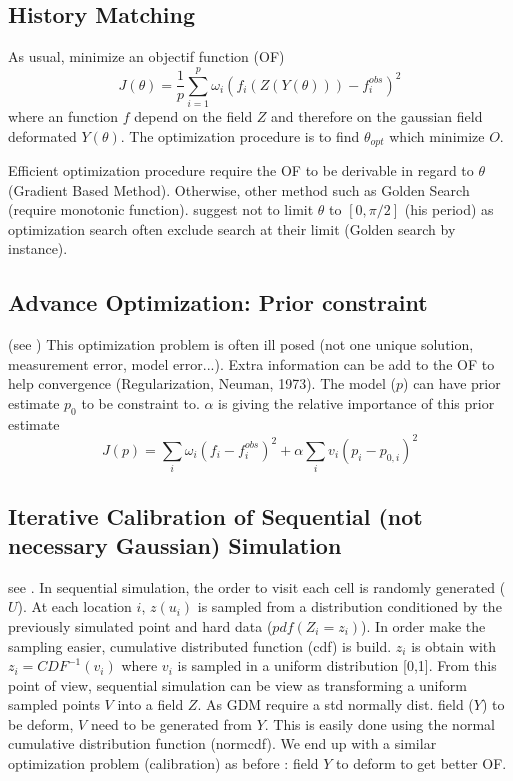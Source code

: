 \documentclass{article}
\begin{document}
\begin{multicols}{2}
\subsection{History Matching}
As usual, minimize an objectif function (OF) 
\[ J(\theta) = \frac{1}{p} \sum_{i=1}^{p} \omega_i (f_i(Z(Y(\theta))) - f_i^{obs})^2 \]
 where an function $f$ depend on the field $Z$ and therefore on the gaussian field deformated $Y(\theta)$. The optimization procedure is to find $\theta_{opt}$ which minimize $O$.

Efficient optimization procedure require the OF to be derivable in regard to $\theta$ (Gradient Based Method). Otherwise, other method such as Golden Search (require monotonic function). \cite{Hu2000} suggest not to limit $\theta$ to $[0,\pi/2]$ (his period) as optimization search often exclude search at their limit (Golden search by instance).

\subsection{Advance Optimization: Prior constraint}
(see \citep{LeRavalec-Dupin2002})
This optimization problem is often ill posed (not one unique solution, measurement error, model error...). Extra information can be add to the OF to help convergence (Regularization, Neuman, 1973). The model ($p$) can have prior estimate $p_0$ to be constraint to. $\alpha$ is giving the relative importance of this prior estimate
\[ J(p)  = \sum_i \omega_i (f_i-f_i^{obs})^2   + \alpha \sum_i v_i (p_i-p_{0,i})^2\]

\subsection{Iterative Calibration of Sequential (not necessary Gaussian) Simulation}
see \cite{Hu2001}.
In sequential simulation, the order to visit each cell is randomly generated ($U$). At each location $i$, $z(u_i)$ is sampled from a distribution conditioned by the previously simulated point and hard data ($pdf(Z_i =z_i)$). In order make the sampling easier, cumulative distributed function (cdf) is build. $z_i$ is obtain with $z_i=CDF^{-1}(v_i)$ where $v_i$ is sampled in a uniform distribution [0,1]. From this point of view, sequential simulation can be view as transforming a uniform sampled points $V$ into a field $Z$. As GDM require a std normally dist. field ($Y$) to be deform, $V$ need to be generated from $Y$. This is easily done using the normal cumulative distribution function (normcdf). We end up with a similar optimization problem (calibration) as before : field $Y$ to deform to get better OF.


\end{multicols}
\end{document}
